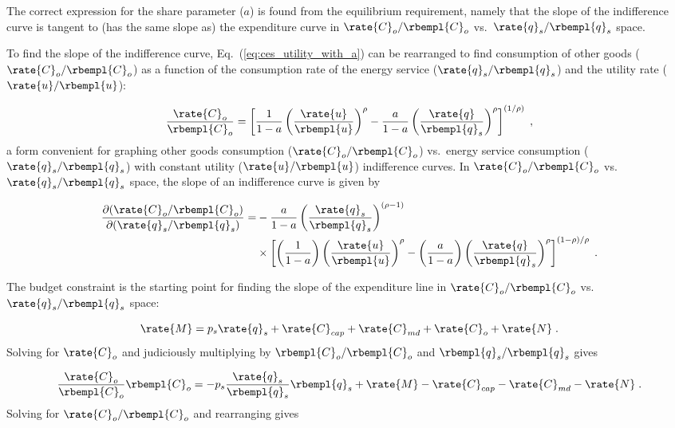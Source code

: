The correct expression for the share parameter ($a$) is found from the 
equilibrium requirement,
namely that the slope of the indifference curve is tangent to 
(has the same slope as) the expenditure curve
in $\rate{C}_o/\rbempl{C}_o$ vs.\ $\rate{q}_s/\rbempl{q}_s$ space.

To find the slope of the indifference curve,
Eq.~(\ref{eq:ces_utility_with_a}) can be rearranged to find 
consumption of other goods ($\rate{C}_o/\rbempl{C}_o$)
as a function of the consumption rate of the energy service 
($\rate{q}_s/\rbempl{q}_s$)
and the utility rate ($\rate{u}/\rbempl{u}$):

\begin{equation}
  \frac{\rate{C}_o}{\rbempl{C}_o} = 
      \left[ \frac{1}{1 - a} \left( \frac{\rate{u}}{\rbempl{u}} \right)^\rho 
            - \frac{a}{1 - a} \left( \frac{\rate{q}}{\rbempl{q}_s} \right)^\rho \right]^{(1/\rho)} \; ,
\end{equation}
%
a form convenient for graphing other goods consumption ($\rate{C}_o/\rbempl{C}_o$) vs.\ 
energy service consumption ($\rate{q}_s/\rbempl{q}_s$) 
with constant utility ($\rate{u}/\rbempl{u}$) indifference curves.
In $\rate{C}_o/\rbempl{C}_o$ vs.\ $\rate{q}_s/\rbempl{q}_s$ space, 
the slope of an indifference curve is given by 

\begin{align} \label{eq:slope_indifference_curve}
  \frac{\partial (\rate{C}_o/\rbempl{C}_o)}{\partial (\rate{q}_s/\rbempl{q}_s)} =&
        -\frac{a}{1 - a} \left( \frac{\rate{q}_s}{\rbempl{q}_s} \right)^{(\rho -1)} \nonumber  \\
        &\times \left[ \left( \frac{1}{1 - a} \right) \left( \frac{\rate{u}}{\rbempl{u}} \right)^\rho
                - \left( \frac{a}{1 - a} \right) 
                          \left( \frac{\rate{q}}{\rbempl{q}_s} \right)^\rho \right]^{(1 - \rho)/\rho} \; .
\end{align}

The budget constraint is the starting point for finding 
the slope of the expenditure line in 
$\rate{C}_o/\rbempl{C}_o$ vs.\ $\rate{q}_s/\rbempl{q}_s$ space:

\begin{equation}
  \rate{M} = p_s \rate{q}_s + \rate{C}_{cap} + \rate{C}_{md} + \rate{C}_o  + \rate{N} \; . 
\end{equation}
%
Solving for $\rate{C}_o$ and judiciously multiplying by $\rbempl{C}_o/\rbempl{C}_o$
and $\rbempl{q}_s/\rbempl{q}_s$ gives

\begin{equation}
  \frac{\rate{C}_o}{\rbempl{C}_o} \rbempl{C}_o = - p_s \frac{\rate{q}_s}{\rbempl{q}_s} \rbempl{q}_s
                        + \rate{M} - \rate{C}_{cap} - \rate{C}_{md}  - \rate{N} \; .
\end{equation}
%
Solving for $\rate{C}_o/\rbempl{C}_o$ and rearranging gives

